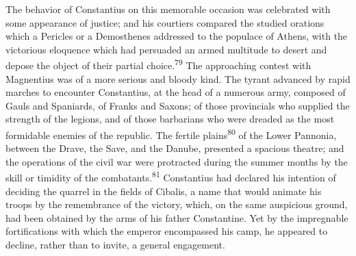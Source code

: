
The behavior of Constantius on this memorable occasion was
celebrated with some appearance of justice; and his courtiers
compared the studied orations which a Pericles or a Demosthenes
addressed to the populace of Athens, with the victorious
eloquence which had persuaded an armed multitude to desert and
depose the object of their partial choice.\textsuperscript{79} The approaching
contest with Magnentius was of a more serious and bloody kind.
The tyrant advanced by rapid marches to encounter Constantius, at
the head of a numerous army, composed of Gauls and Spaniards, of
Franks and Saxons; of those provincials who supplied the strength
of the legions, and of those barbarians who were dreaded as the
most formidable enemies of the republic. The fertile plains\textsuperscript{80} of
the Lower Pannonia, between the Drave, the Save, and the Danube,
presented a spacious theatre; and the operations of the civil war
were protracted during the summer months by the skill or timidity
of the combatants.\textsuperscript{81} Constantius had declared his intention of
deciding the quarrel in the fields of Cibalis, a name that would
animate his troops by the remembrance of the victory, which, on
the same auspicious ground, had been obtained by the arms of his
father Constantine. Yet by the impregnable fortifications with
which the emperor encompassed his camp, he appeared to decline,
rather than to invite, a general engagement.

